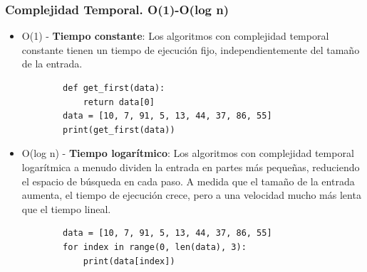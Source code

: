 \documentclass[xcolor=table]{beamer}
\begin{document}
\begin{frame} [fragile] \frametitle{Complejidad Temporal. O(1)-O(log n)}\small  

\begin{itemize}
    \item O(1) - \textbf{Tiempo constante}: Los algoritmos con complejidad temporal constante tienen un tiempo de ejecución fijo, independientemente del tamaño de la entrada. 
    \begin{verbatim}
        def get_first(data):
            return data[0]
        data = [10, 7, 91, 5, 13, 44, 37, 86, 55]
        print(get_first(data))
    \end{verbatim}

     \item O(log n) - \textbf{Tiempo logarítmico}: Los algoritmos con complejidad temporal logarítmica a menudo dividen la entrada en partes más pequeñas, reduciendo el espacio de búsqueda en cada paso.  A medida que el tamaño de la entrada aumenta, el tiempo de ejecución crece, pero a una velocidad mucho más lenta que el tiempo lineal.
 
    \begin{verbatim}
        data = [10, 7, 91, 5, 13, 44, 37, 86, 55]
        for index in range(0, len(data), 3):
            print(data[index])
    \end{verbatim}
\end{itemize}

\end{frame} 
\end{document}
